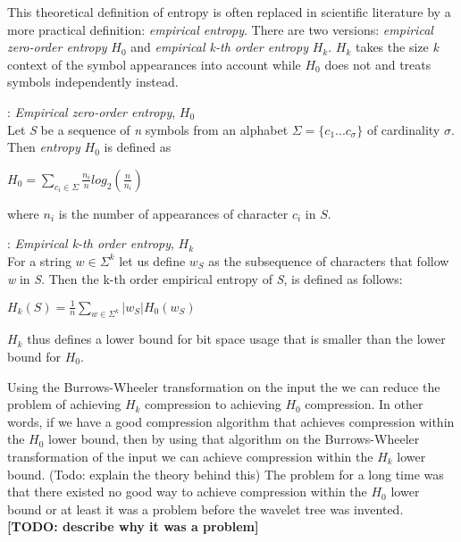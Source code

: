 This theoretical definition of entropy is often replaced in scientific literature by a more practical definition: \textit{empirical entropy}.
There are two versions: \textit{empirical zero-order entropy} $H_0$ and \textit{empirical k-th order entropy} $H_k$. $H_k$ takes the size \textit{k} context of the symbol appearances into account while $H_0$ does not and treats symbols independently instead. 

\begin{mdframed}[nobreak, linecolor=lightgray, linewidth=2pt]
\begin{definition}: \textit{Empirical zero-order entropy}, $H_0$ \\
Let \textit{S} be a sequence of \textit{n} symbols from an alphabet $\Sigma = \lbrace c_1 ... c_\sigma \rbrace$ of cardinality $\sigma$.
Then \textit{entropy} $H_0$ is defined as
\begin{center}
$H_0 = \sum\limits_{c_i \in \Sigma} \frac{n_i}{n} log_2(\frac{n}{n_i})$
\end{center}
where $n_i$ is the number of appearances of character $c_i$ in $S$.
\end{definition}
\begin{definition}: \textit{Empirical k-th order entropy}, $H_k$ \\
For a string $w \in \Sigma^k$ let us define $w_S$ as the subsequence of characters that follow \textit{w} in \textit{S}. 
Then the k-th order empirical entropy of \textit{S}, is defined as follows:
\begin{center}
$H_k(S) = \frac{1}{n} \sum\limits_{w \in \Sigma^k} | w_S |H_0(w_S)$
\end{center}
\end{definition}
\end{mdframed}
$H_k$ thus defines a lower bound for bit space usage that is smaller than the lower bound for $H_0$.

Using the Burrows-Wheeler transformation on the input the we can reduce the problem of achieving $H_k$ compression to achieving $H_0$ compression.
In other words, if we have a good compression algorithm that achieves compression within the $H_0$ lower bound, then by using that algorithm on the Burrows-Wheeler transformation of the input we can achieve compression within the $H_k$ lower bound. (Todo: explain the theory behind this)
The problem for a long time was that there existed no good way to achieve compression within the $H_0$ lower bound or at least it was a problem before the wavelet tree was invented. \textbf{[TODO: describe why it was a problem]} 


